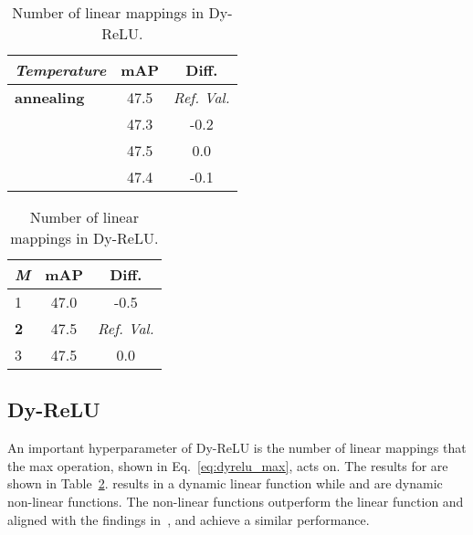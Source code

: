 \documentclass[lettersize,journal]{IEEEtran}
\begin{document}
\begin{table}[t!]

\centering
\begin{minipage}[t]{\columnwidth}
\caption{Temperature  for computing Dy-Conv attention weights}
\label{tab:abl_dyconv_tau}

\centering
\begin{tabular}{@{}lcc@{}}
\toprule
\textit{Temperature} & \textbf{mAP} & \textbf{Diff.} \\ \midrule
\textbf{ annealing} & 47.5 & \textit{Ref. Val.}\\ \midrule
 & 47.3 & -0.2 \\
 & 47.5 & 0.0 \\
 & 47.4 & -0.1 \\
 \bottomrule
\end{tabular}
\end{minipage}


\bigskip

\centering
\begin{minipage}[t]{\columnwidth}
\caption{Number of linear mappings  in Dy-ReLU.}
\label{tab:abl_dyrelu_m}

\centering
\begin{tabular}{@{}lcc@{}}
\toprule
\textit{M} & \textbf{mAP} & \textbf{Diff.} \\ \midrule
1 & 47.0 & -0.5 \\
\textbf{2} & 47.5 & \textit{Ref. Val.}\\
3 & 47.5 & 0.0\\
 \bottomrule
\end{tabular}
\end{minipage}

\end{table}

\subsection{Dy-ReLU}
\label{subsec:abl_dyrelu}

An important hyperparameter of Dy-ReLU is the number of linear mappings  that the max operation, shown in Eq.~\ref{eq:dyrelu_max}, acts on. The results for  are shown in Table~\ref{tab:abl_dyrelu_m}.  results in a dynamic linear function while  and  are dynamic non-linear functions. The non-linear functions outperform the linear function and aligned with the findings in~\cite{chen2020dynamic_relu},  and  achieve a similar performance.
\end{document}
